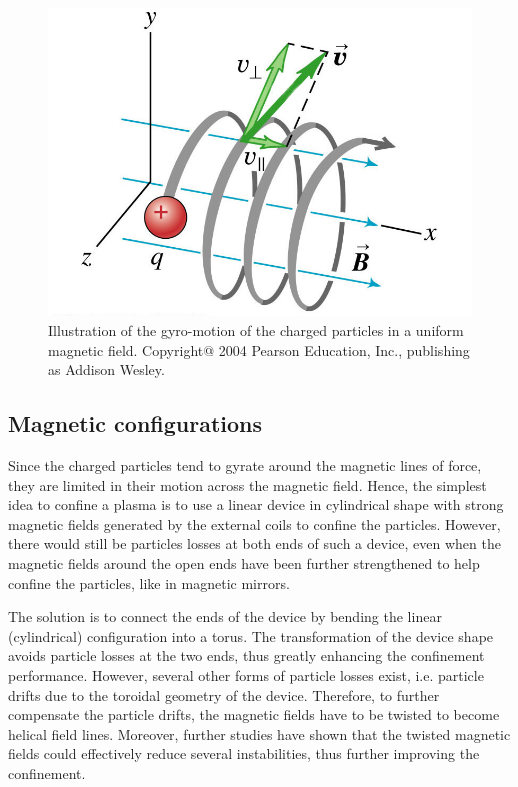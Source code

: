 \begin{figure}[h]
\begin{centering}
\includegraphics[scale=0.3]{gyro_motion.png}
\par\end{centering}
\caption{Illustration of the gyro-motion of the charged particles in a uniform magnetic field. Copyright@ 2004 Pearson Education, Inc., publishing as Addison Wesley.}
\label{fig:gyro_motion}
\end{figure}


\subsection{Magnetic configurations}


Since the charged particles tend to gyrate around the magnetic lines of force, they are limited in their motion across the magnetic field. Hence, the simplest idea to confine a plasma is to use a linear device in cylindrical shape with strong magnetic fields generated by the external coils to confine the particles. However, there would still be particles losses at both ends of such a device, even when the magnetic fields around the open ends have been further strengthened to help confine the particles, like in magnetic mirrors.

The solution is to connect the ends of the device by bending the linear (cylindrical) configuration into a torus. The transformation of the device shape avoids particle losses at the two ends, thus greatly enhancing the confinement performance. However, several other forms of particle losses exist, i.e. particle drifts due to the toroidal geometry of the device. Therefore, to further compensate the particle drifts, the magnetic fields have to be twisted to become helical field lines. Moreover, further studies have shown that the twisted magnetic fields could effectively reduce several instabilities, thus further improving the confinement.


